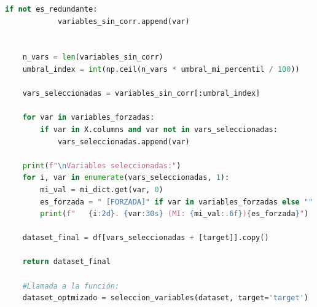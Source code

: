 \begin{lstlisting}[language=Python, caption=Función para seleccionar variables, label=lst:seleccion_variables]
        if not es_redundante: 
            variables_sin_corr.append(var)
    
    
    n_vars = len(variables_sin_corr) 
    umbral_index = int(np.ceil(n_vars * umbral_mi_percentil / 100)) 

    vars_seleccionadas = variables_sin_corr[:umbral_index] 

    for var in variables_forzadas:
        if var in X.columns and var not in vars_seleccionadas:
            vars_seleccionadas.append(var)
    
    print(f"\nVariables seleccionadas:")
    for i, var in enumerate(vars_seleccionadas, 1):
        mi_val = mi_dict.get(var, 0)
        es_forzada = " [FORZADA]" if var in variables_forzadas else ""
        print(f"   {i:2d}. {var:30s} (MI: {mi_val:.6f}){es_forzada}")

    dataset_final = df[vars_seleccionadas + [target]].copy()
    
    return dataset_final

    #Llamada a la función:
    dataset_optmizado = seleccion_variables(dataset, target='target') 
\end{lstlisting}

